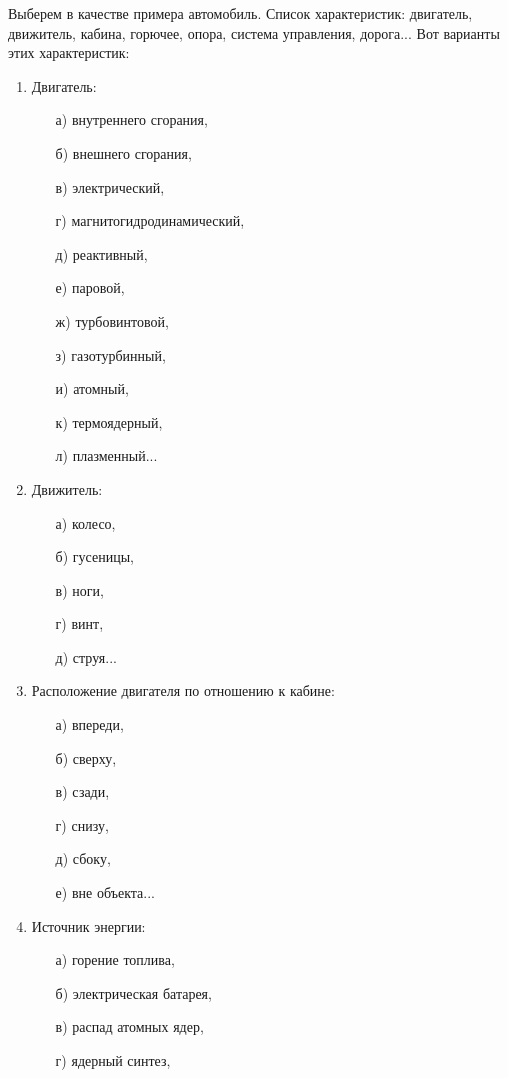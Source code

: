 \documentclass[11pt,a4paper]{article}
\begin{document}
Выберем в качестве примера автомобиль. Список характеристик: двигатель,
движитель, кабина, горючее, опора, система управления, дорога... Вот варианты
этих характеристик:
\begin{enumerate}[noitemsep]
\item Двигатель: 
  \begin{itemize}[noitemsep]
  \item[а)] внутреннего сгорания,
  \item[б)] внешнего сгорания,
  \item[в)] электрический,
  \item[г)] магнитогидродинамический,
  \item[д)] реактивный,
  \item[е)] паровой,
  \item[ж)] турбовинтовой,
  \item[з)] газотурбинный,
  \item[и)] атомный,
  \item[к)] термоядерный,
  \item[л)] плазменный...
  \end{itemize}
\item Движитель: 
  \begin{itemize}[noitemsep]
  \item[а)] колесо,
  \item[б)] гусеницы,
  \item[в)] ноги,
  \item[г)] винт,
  \item[д)] струя...
  \end{itemize}
\item Расположение двигателя по отношению к кабине: 
  \begin{itemize}[noitemsep]
  \item[а)] впереди,
  \item[б)] сверху,
  \item[в)] сзади,
  \item[г)] снизу,
  \item[д)] сбоку,
  \item[е)] вне объекта...
  \end{itemize}
\item Источник энергии: 
  \begin{itemize}[noitemsep]
  \item[а)] горение топлива,
  \item[б)] электрическая батарея,
  \item[в)] распад атомных ядер,
  \item[г)] ядерный синтез,

\end{itemize}
\end{enumerate}
\end{document}
